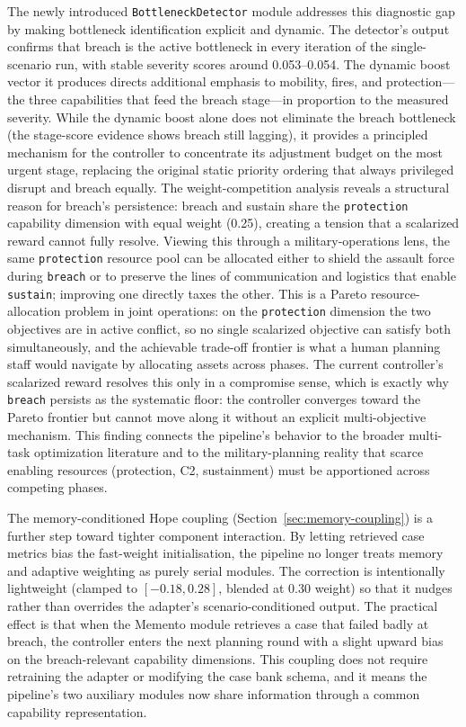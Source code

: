 The newly introduced \texttt{BottleneckDetector} module addresses this diagnostic gap by making bottleneck identification explicit and dynamic. The detector's output confirms that breach is the active bottleneck in every iteration of the single-scenario run, with stable severity scores around 0.053--0.054. The dynamic boost vector it produces directs additional emphasis to mobility, fires, and protection---the three capabilities that feed the breach stage---in proportion to the measured severity. While the dynamic boost alone does not eliminate the breach bottleneck (the stage-score evidence shows breach still lagging), it provides a principled mechanism for the controller to concentrate its adjustment budget on the most urgent stage, replacing the original static priority ordering that always privileged disrupt and breach equally. The weight-competition analysis reveals a structural reason for breach's persistence: breach and sustain share the \texttt{protection} capability dimension with equal weight (0.25), creating a tension that a scalarized reward cannot fully resolve. Viewing this through a military-operations lens, the same \texttt{protection} resource pool can be allocated either to shield the assault force during \texttt{breach} or to preserve the lines of communication and logistics that enable \texttt{sustain}; improving one directly taxes the other. This is a Pareto resource-allocation problem in joint operations: on the \texttt{protection} dimension the two objectives are in active conflict, so no single scalarized objective can satisfy both simultaneously, and the achievable trade-off frontier is what a human planning staff would navigate by allocating assets across phases. The current controller's scalarized reward resolves this only in a compromise sense, which is exactly why \texttt{breach} persists as the systematic floor: the controller converges toward the Pareto frontier but cannot move along it without an explicit multi-objective mechanism. This finding connects the pipeline's behavior to the broader multi-task optimization literature \citep{yu2020pcgrad} and to the military-planning reality that scarce enabling resources (protection, C2, sustainment) must be apportioned across competing phases.

The memory-conditioned Hope coupling (Section~\ref{sec:memory-coupling}) is a further step toward tighter component interaction. By letting retrieved case metrics bias the fast-weight initialisation, the pipeline no longer treats memory and adaptive weighting as purely serial modules. The correction is intentionally lightweight (clamped to $[-0.18, 0.28]$, blended at 0.30 weight) so that it nudges rather than overrides the adapter's scenario-conditioned output. The practical effect is that when the Memento module retrieves a case that failed badly at breach, the controller enters the next planning round with a slight upward bias on the breach-relevant capability dimensions. This coupling does not require retraining the adapter or modifying the case bank schema, and it means the pipeline's two auxiliary modules now share information through a common capability representation.


